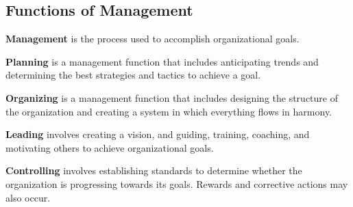 \documentclass[english, 12pt]{article}
\begin{document}
\subsection{Functions of Management}
\begin{defn}
\textbf{Management} is the process used to accomplish organizational goals.
\end{defn}
\begin{defn}
\textbf{Planning} is a management function that includes anticipating trends and determining the best strategies and tactics to achieve a goal.
\end{defn}
\begin{defn}
\textbf{Organizing} is a management function that includes designing the structure of the organization and creating a system in which everything flows in harmony.
\end{defn}
\begin{defn}
\textbf{Leading} involves creating a vision, and guiding, training, coaching, and motivating others to achieve organizational goals.
\end{defn}
\begin{defn}
\textbf{Controlling} involves establishing standards to determine whether the organization is progressing towards its goals. Rewards and corrective actions may also occur.
\end{defn}
\end{document}
